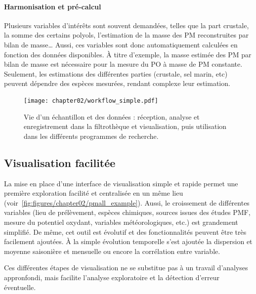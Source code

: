 \paragraph{Harmonisation et pré-calcul}%
\label{par:harmonisation_et_pré_calcul}

Plusieurs variables d'intérêts sont souvent demandées, telles que la part crustale, la
somme des certains polyols, l'estimation de la masse des PM reconstruites par bilan de
masse… Aussi, ces variables sont donc automatiquement calculées en fonction des données
disponibles. À titre d'exemple, la masse estimée des PM par bilan de masse est nécessaire
pour la mesure du PO à masse de PM constante. Seulement, les estimations des différentes
parties (crustale, sel marin, etc) peuvent dépendre des espèces mesurées, rendant complexe
leur estimation.

\begin{landscape}
\begin{figure}[ht]
    \centering
    \texttt{[image: chapter02/workflow\_simple.pdf]}
    \caption{Vie d'un échantillon et des données : réception, analyse et enregistrement
        dans la filtrothèque et visualisation, puis utilisation dans les différents
        programmes de recherche.}%
    \label{fig:bdd}
\end{figure}
\end{landscape}

\subsection{Visualisation facilitée}%
\label{sub:visualisation_facilité}

La mise en place d'une interface de visualisation simple et rapide permet une première
exploration facilité et centralisée en un même lieu
(voir~\ref{fig:figures/chapter02/pmall_example}). Aussi, le croissement de différentes
variables (lieu de prélèvement, espèces chimiques, sources issues des études PMF, mesure
du potentiel oxydant, variables météorologiques, etc.) est grandement simplifié.  De même,
cet outil est évolutif et des fonctionnalités peuvent être très facilement ajoutées. À la
simple évolution temporelle s'est ajoutée la dispersion et moyenne saisonière et mensuelle
ou encore la corrélation entre variable.

Ces différentes étapes de visualisation ne se substitue pas à un travail d'analyses
appronfondi, mais facilite l'analyse exploratoire et la détection d'erreur éventuelle.

